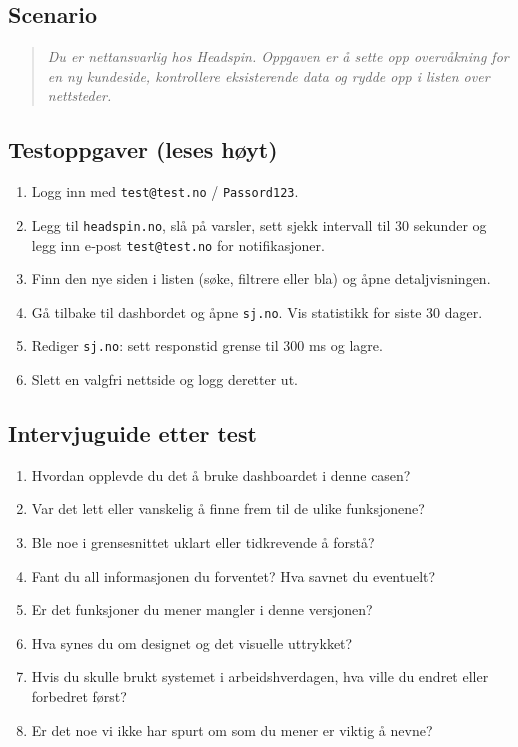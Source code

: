 \subsection*{Scenario}
\begin{quote}\itshape
Du er nettansvarlig hos Headspin. Oppgaven er å sette opp overvåkning for en ny kundeside, kontrollere eksisterende data og rydde opp i listen over nettsteder.
\end{quote}

\subsection*{Testoppgaver (leses høyt)}
\begin{enumerate}[nosep]
  \item Logg inn med \texttt{test@test.no} / \texttt{Passord123}.  
  \item Legg til \texttt{headspin.no}, slå på varsler, sett sjekk intervall til 30 sekunder og legg inn e‑post \texttt{test@test.no} for notifikasjoner.  
  \item Finn den nye siden i listen (søke, filtrere eller bla) og åpne detaljvisningen.  
  \item Gå tilbake til dashbordet og åpne \texttt{sj.no}. Vis statistikk for siste 30 dager.  
  \item Rediger \texttt{sj.no}: sett responstid grense til 300 ms og lagre.  
  \item Slett en valgfri nettside og logg deretter ut.
\end{enumerate}

\subsection*{Intervjuguide etter test}
\begin{enumerate}[nosep]
  \item Hvordan opplevde du det å bruke dashboardet i denne casen?  
  \item Var det lett eller vanskelig å finne frem til de ulike funksjonene?  
  \item Ble noe i grensesnittet uklart eller tidkrevende å forstå?  
  \item Fant du all informasjonen du forventet? Hva savnet du eventuelt?  
  \item Er det funksjoner du mener mangler i denne versjonen?  
  \item Hva synes du om designet og det visuelle uttrykket?  
  \item Hvis du skulle brukt systemet i arbeidshverdagen, hva ville du endret eller forbedret først?  
  \item Er det noe vi ikke har spurt om som du mener er viktig å nevne?
\end{enumerate}

